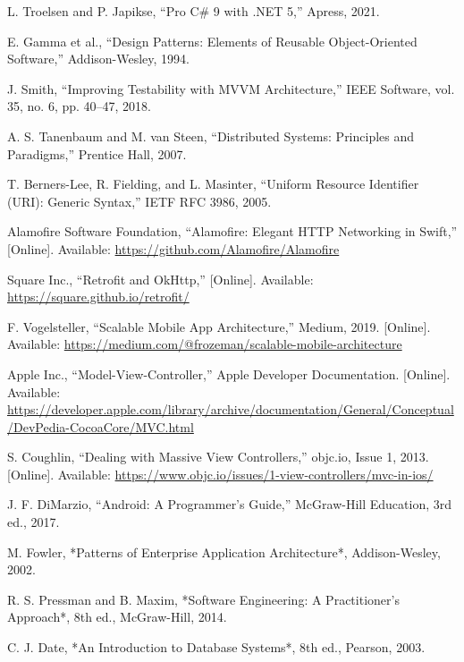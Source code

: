 \documentclass[12pt]{report}
\begin{document}
\begin{thebibliography}{1}
  L. Troelsen and P. Japikse, ``Pro C\# 9 with .NET 5,'' Apress, 2021.

  E. Gamma et al., ``Design Patterns: Elements of Reusable Object-Oriented Software,'' Addison-Wesley, 1994.

  J. Smith, ``Improving Testability with MVVM Architecture,'' IEEE Software, vol. 35, no. 6, pp. 40–47, 2018.

  A. S. Tanenbaum and M. van Steen, ``Distributed Systems: Principles and Paradigms,'' Prentice Hall, 2007.

  T. Berners-Lee, R. Fielding, and L. Masinter, ``Uniform Resource Identifier (URI): Generic Syntax,'' IETF RFC 3986, 2005.

  Alamofire Software Foundation, ``Alamofire: Elegant HTTP Networking in Swift,'' [Online]. Available: \url{https://github.com/Alamofire/Alamofire}

  Square Inc., ``Retrofit and OkHttp,'' [Online]. Available: \url{https://square.github.io/retrofit/}

  F. Vogelsteller, ``Scalable Mobile App Architecture,'' Medium, 2019. [Online]. Available: \url{https://medium.com/@frozeman/scalable-mobile-architecture}

  Apple Inc., ``Model-View-Controller,'' Apple Developer Documentation. [Online]. Available: \url{https://developer.apple.com/library/archive/documentation/General/Conceptual/DevPedia-CocoaCore/MVC.html}

  S. Coughlin, ``Dealing with Massive View Controllers,'' objc.io, Issue 1, 2013. [Online]. Available: \url{https://www.objc.io/issues/1-view-controllers/mvc-in-ios/}

  J. F. DiMarzio, ``Android: A Programmer’s Guide,'' McGraw-Hill Education, 3rd ed., 2017.
  
  M. Fowler, *Patterns of Enterprise Application Architecture*, Addison-Wesley, 2002.

  R. S. Pressman and B. Maxim, *Software Engineering: A Practitioner’s Approach*, 8th ed., McGraw-Hill, 2014.

  C. J. Date, *An Introduction to Database Systems*, 8th ed., Pearson, 2003.


\end{thebibliography}
\end{document}
